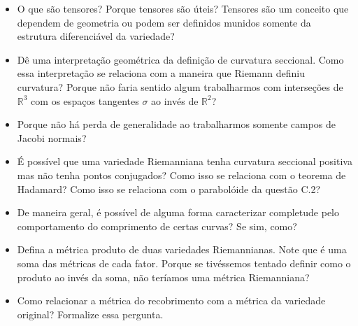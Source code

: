 \begin{itemize}
\begin{itemize}
    \item O que são tensores? Porque tensores são úteis? Tensores são um conceito que dependem de geometria ou podem ser definidos munidos somente da estrutura diferenciável da variedade? 
    \item Dê uma interpretação geométrica da definição de curvatura seccional. Como essa interpretação se relaciona com a maneira que Riemann definiu curvatura? Porque não faria sentido algum trabalharmos com interseções de $\mathbb{R}^3$ com os espaços tangentes $\sigma$ ao invés de $\mathbb{R}^2$?
    \item Porque não há perda de generalidade ao trabalharmos somente campos de Jacobi normais?
    \item É possível que uma variedade Riemanniana tenha curvatura seccional positiva mas não tenha pontos conjugados? Como isso se relaciona com o teorema de Hadamard? Como isso se relaciona com o parabolóide da questão C.2?
    \item De maneira geral, é possível de alguma forma caracterizar completude pelo comportamento do comprimento de certas curvas? Se sim, como?
    \item Defina a métrica produto de duas variedades Riemannianas. Note que é uma soma das métricas de cada fator. Porque se tivéssemos tentado definir como o produto ao invés da soma, não teríamos uma métrica Riemanniana? 
    \item Como relacionar a métrica do recobrimento com a métrica da variedade original? Formalize essa pergunta. 
  \end{itemize}


\end{itemize}





